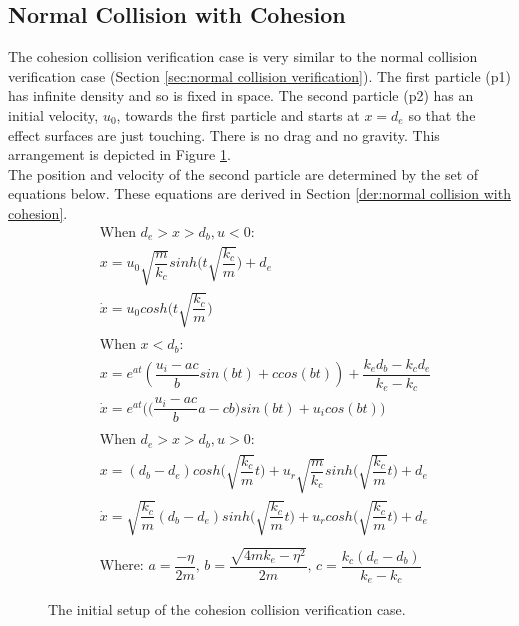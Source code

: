 \documentclass[a4paper,11pt,titlepage]{report}
\begin{document}
\subsection{Normal Collision with Cohesion}
\label{sec:normal collision with cohesion verification}
The cohesion collision verification case is very similar to the normal collision verification case (Section \ref{sec:normal collision verification}). The first particle (p1) has infinite density and so is fixed in space. The second particle (p2) has an initial velocity, $u_0$, towards the first particle and starts at $x = d_e$ so that the effect surfaces are just touching. There is no drag and no gravity. This arrangement is depicted in Figure \ref{fig:cohesion collision}.
\\The position and velocity of the second particle are determined by the set of equations below. These equations are derived in Section \ref{der:normal collision with cohesion}.
\begin{align}
&\text{When $d_e > x > d_b, u < 0$:} \nonumber \\
&x = u_0 \sqrt{\dfrac{m}{k_c}} sinh\Big(t\sqrt{\dfrac{k_c}{m}}\Big) + d_e \\
&\dot{x} = u_0 cos h\Big(t\sqrt{\dfrac{k_c}{m}}\Big) \\ \nonumber \\
&\text{When $x < d_b$:} \nonumber \\
&x = e^{at} (\dfrac{u_i - ac}{b} sin(bt) + c cos (bt)) + \dfrac{k_e d_b - k_c d_e}{k_e - k_c} \\
&\dot{x} = e^{at}\Big(\Big(\dfrac{u_i - ac}{b} a - c b\Big)sin(bt) + u_i cos(bt)\Big) \\ \nonumber \\
&\text{When $d_e > x > d_b, u > 0$:} \nonumber \\
&x = (d_b - d_e)cosh\Big(\sqrt{\dfrac{k_c}{m}} t\Big) + u_r \sqrt{\dfrac{m}{k_c}} sinh\Big(\sqrt{\dfrac{k_c}{m}}t\Big) + d_e \\
&\dot{x} = \sqrt{\dfrac{k_c}{m}}(d_b - d_e)sinh\Big(\sqrt{\dfrac{k_c}{m}} t\Big) + u_r cosh\Big(\sqrt{\dfrac{k_c}{m}}t\Big) + d_e \\ \nonumber \\
&\text{Where: } a = \dfrac{-\eta}{2m} \text{,    } b = \dfrac{\sqrt{4mk_e - \eta ^ 2}}{2m} \text{,    } c = \dfrac{k_c (d_e - d_b)}{k_e - k_c} \nonumber
\end{align}
\begin{figure}[!ht]
\centering

\caption{The initial setup of the cohesion collision verification case.}
\label{fig:cohesion collision}
\end{figure}
\end{document}
